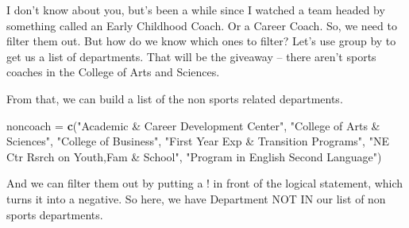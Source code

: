 \documentclass[]{book}
\newenvironment{Shaded}{\begin{snugshade}}{\end{snugshade}}
\newcommand{\KeywordTok}[1]{\textcolor[rgb]{0.13,0.29,0.53}{\textbf{#1}}}
\newcommand{\DataTypeTok}[1]{\textcolor[rgb]{0.13,0.29,0.53}{#1}}
\newcommand{\StringTok}[1]{\textcolor[rgb]{0.31,0.60,0.02}{#1}}
\newcommand{\OperatorTok}[1]{\textcolor[rgb]{0.81,0.36,0.00}{\textbf{#1}}}
\newcommand{\NormalTok}[1]{#1}
\begin{document}
I don't know about you, but's been a while since I watched a team headed
by something called an Early Childhood Coach. Or a Career Coach. So, we
need to filter them out. But how do we know which ones to filter? Let's
use group by to get us a list of departments. That will be the giveaway
-- there aren't sports coaches in the College of Arts and Sciences.

\begin{Shaded}
\end{Shaded}

From that, we can build a list of the non sports related departments.

\begin{Shaded}
\begin{Highlighting}[]
\NormalTok{noncoach =}\StringTok{ }\KeywordTok{c}\NormalTok{(}\StringTok{"Academic & Career Development Center"}\NormalTok{, }\StringTok{"College of Arts & Sciences"}\NormalTok{, }\StringTok{"College of Business"}\NormalTok{, }\StringTok{"First Year Exp & Transition Programs"}\NormalTok{, }\StringTok{"NE Ctr  Rsrch on Youth,Fam & School"}\NormalTok{, }\StringTok{"Program in English Second Language"}\NormalTok{)}
\end{Highlighting}
\end{Shaded}

And we can filter them out by putting a ! in front of the logical
statement, which turns it into a negative. So here, we have Department
NOT IN our list of non sports departments.

\begin{Shaded}
\end{Shaded}
\end{document}
